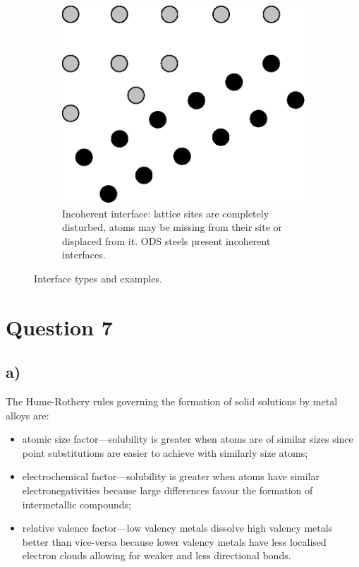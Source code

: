 \documentclass[a4paper]{article}
\begin{document}
\begin{figure}
\begin{subfigure}[t]{0.3\linewidth}
			\label{sf:scohint}
		\end{subfigure}
		~
		\begin{subfigure}[t]{0.3\linewidth}
			\centering
			\includegraphics[width=\linewidth]{icohint.eps}
			\caption{Incoherent interface: lattice sites are completely disturbed, atoms may be missing from their site or displaced from it. ODS steels present incoherent interfaces.}
			\label{sf:icohint}
		\end{subfigure}
		\caption{Interface types and examples.}
		\label{f:int}
	\end{figure}
	
	\section{Question 7}
	\subsection{a)}
	The Hume-Rothery rules governing the formation of solid solutions by metal alloys are:
	\begin{itemize}
		\item atomic size factor---solubility is greater when atoms are of similar sizes since point substitutions are easier to achieve with similarly size atoms;
		\item electrochemical factor---solubility is greater when atoms have similar electronegativities because large differences favour the formation of intermetallic compounds;
		\item relative valence factor---low valency metals dissolve high valency metals better than vice-versa because lower valency metals have less localised electron clouds allowing for weaker and less directional bonds.
	\end{itemize}
\end{document}

